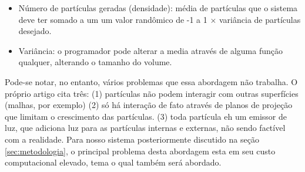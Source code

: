 \begin{itemize}\setlength{\itemsep}{0.02em}
  \item Número de partículas geradas (densidade): média de partículas que o sistema deve ter somado a um um valor randômico de -1 a 1 $\times$  variância de partículas desejado. 
  \item Variância: o programador pode alterar a media através de alguma função qualquer, alterando o tamanho do volume.
\end{itemize}


Pode-se notar, no entanto, vários problemas que essa abordagem não trabalha. O próprio artigo cita três: (1) partículas não podem interagir com outras superfícies (malhas, por exemplo) (2) só há interação de fato através de planos de projeção que limitam o crescimento das partículas. (3) toda partícula eh um emissor de luz, que adiciona luz para as partículas internas e externas, não sendo factível com a realidade. Para nosso sistema posteriormente discutido na seção \ref{sec:metodologia}, o principal problema desta abordagem esta em seu custo computacional elevado, tema o qual também será abordado.
